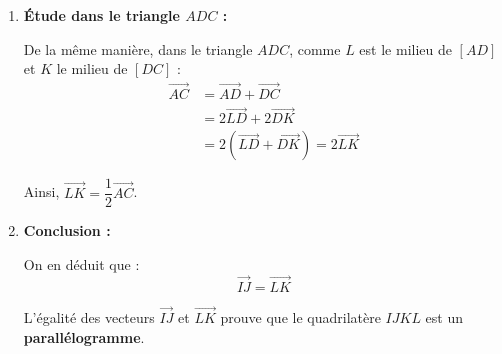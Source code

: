 \begin{exercice}
\begin{demo}
\begin{enumerate}
			      Ainsi, $\vec{IJ} = \dfrac{1}{2}\times\vec{AC}$.

			\item \textbf{Étude dans le triangle $ADC$ :}

			      De la même manière, dans le triangle $ADC$, comme $L$ est le milieu de $[AD]$ et $K$ le milieu de $[DC]$ :
			      \begin{align*}
				      \vec{AC} & = \vec{AD} + \vec{DC}                \\
				               & = 2\vec{LD} + 2\vec{DK}              \\
				               & = 2(\vec{LD} + \vec{DK}) = 2\vec{LK}
			      \end{align*}

			      Ainsi, $\vec{LK} = \dfrac{1}{2}\vec{AC}$.

			\item \textbf{Conclusion :}

			      On en déduit que :
			      \[
				      \vec{IJ} = \vec{LK}
			      \]

			      L'égalité des vecteurs $\vec{IJ}$ et $\vec{LK}$ prouve que le quadrilatère $IJKL$ est un \textbf{parallélogramme}.
		\end{enumerate}
	\end{demo}
\end{exercice}

